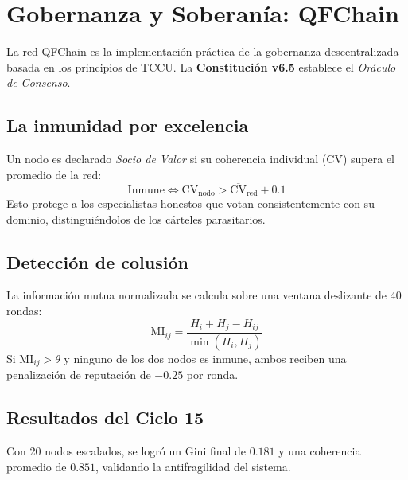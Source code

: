 \chapter{Gobernanza y Soberanía: QFChain}
La red QFChain es la implementación práctica de la gobernanza descentralizada basada en los principios de TCCU. La \textbf{Constitución v6.5} establece el \emph{Oráculo de Consenso}.

\section{La inmunidad por excelencia}
Un nodo es declarado \emph{Socio de Valor} si su coherencia individual (CV) supera el promedio de la red:
\begin{equation}
\text{Inmune} \iff \text{CV}_{\text{nodo}} > \overline{\text{CV}}_{\text{red}} + 0.1
\end{equation}
Esto protege a los especialistas honestos que votan consistentemente con su dominio, distinguiéndolos de los cárteles parasitarios.

\section{Detección de colusión}
La información mutua normalizada se calcula sobre una ventana deslizante de 40 rondas:
\begin{equation}
\text{MI}_{ij} = \frac{H_i + H_j - H_{ij}}{\min(H_i, H_j)}
\end{equation}
Si $\text{MI}_{ij} > \theta$ y ninguno de los dos nodos es inmune, ambos reciben una penalización de reputación de $-0.25$ por ronda.

\section{Resultados del Ciclo 15}
Con 20 nodos escalados, se logró un Gini final de $0.181$ y una coherencia promedio de $0.851$, validando la antifragilidad del sistema.
